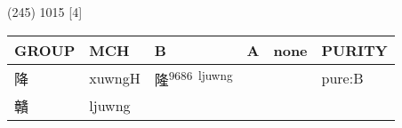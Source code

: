 \documentclass[14pt,a4paper]{scrartcl}
\begin{document}
(245) 1015 {[}4{]}

\begin{longtable}[c]{@{}llllll@{}}
\toprule
\begin{minipage}[b]{0.14\columnwidth}\raggedright\strut
GROUP
\strut\end{minipage} &
\begin{minipage}[b]{0.14\columnwidth}\raggedright\strut
MCH
\strut\end{minipage} &
\begin{minipage}[b]{0.14\columnwidth}\raggedright\strut
B
\strut\end{minipage} &
\begin{minipage}[b]{0.14\columnwidth}\raggedright\strut
A
\strut\end{minipage} &
\begin{minipage}[b]{0.14\columnwidth}\raggedright\strut
none
\strut\end{minipage} &
\begin{minipage}[b]{0.14\columnwidth}\raggedright\strut
PURITY
\strut\end{minipage}\tabularnewline
\midrule
\endhead
\begin{minipage}[t]{0.14\columnwidth}\raggedright\strut
降
\strut\end{minipage} &
\begin{minipage}[t]{0.14\columnwidth}\raggedright\strut
xuwngH
\strut\end{minipage} &
\begin{minipage}[t]{0.14\columnwidth}\raggedright\strut
隆\textsuperscript{9686~ljuwng}
\strut\end{minipage} &
\begin{minipage}[t]{0.14\columnwidth}\raggedright\strut
\strut\end{minipage} &
\begin{minipage}[t]{0.14\columnwidth}\raggedright\strut
\strut\end{minipage} &
\begin{minipage}[t]{0.14\columnwidth}\raggedright\strut
pure:B
\strut\end{minipage}\tabularnewline
\begin{minipage}[t]{0.14\columnwidth}\raggedright\strut
贛
\strut\end{minipage} &
\begin{minipage}[t]{0.14\columnwidth}\raggedright\strut
ljuwng
\strut\end{minipage} &
\begin{minipage}[t]{0.14\columnwidth}\raggedright\strut
\strut\end{minipage} &

\end{longtable}
\end{document}
